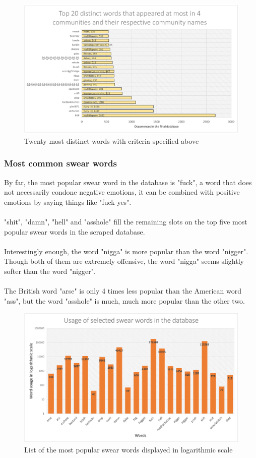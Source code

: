 \documentclass[openany]{article}
\begin{document}
\begin{figure}[H]
    \centering
    \includegraphics[width=\textwidth]{topdistinctwords.pdf}
    \caption{Twenty most distinct words with criteria specified above}
    \label{fig:mesh1}
\end{figure}


\subsubsection{Most common swear words}
By far, the most popular swear word in the database is "fuck", a word that does not necessarily condone negative emotions, it can be combined with positive emotions by saying things like "fuck yes". \\ \\
"shit", "damn", "hell" and "asshole" fill the remaining slots on the top five most popular swear words in the scraped database. \\ \\
Interestingly enough, the word "nigga" is more popular than the word "nigger". Though both of them are extremely offensive, the word "nigga" seems slightly softer than the word "nigger".\\ \\
The British word "arse" is only 4 times less popular than the American word "ass", but the word "asshole" is much, much more popular than the other two.
\begin{figure}[H]
    \centering
    \includegraphics[width=\textwidth]{swearwords.pdf}
    \caption{List of the most popular swear words displayed in logarithmic scale}
    \label{fig:mesh1}
\end{figure}
\end{document}
